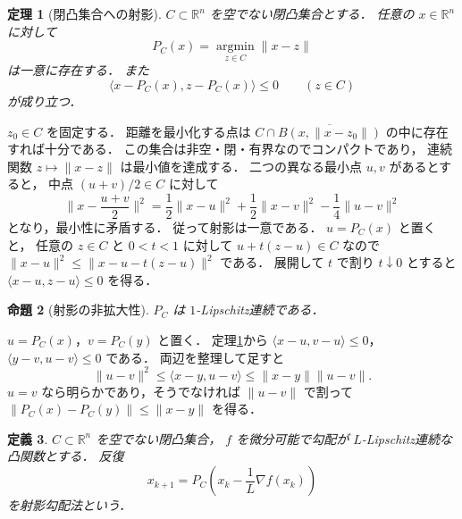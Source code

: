 \documentclass[a5paper,10pt,onecolumn]{jsarticle}
\makeatletter
\theoremstyle{mathnotetheorem}
\newtheorem{theorem}{定理}[section]
\newtheorem{definition}[theorem]{定義}
\newtheorem{proposition}[theorem]{命題}
\renewcommand{\proofname}{証明}
\renewenvironment{proof}[1][\proofname]{%
  \par\pushQED{\qed}\normalfont\topsep4\p@\@plus2\p@\relax
  \trivlist\item[\hskip\labelsep\bfseries #1]\ignorespaces
}{\popQED\endtrivlist\@endpefalse}
\newcommand{\norm}[1]{\lVert #1\rVert}
\makeatother
\begin{document}
\begin{theorem}[閉凸集合への射影]\label{thm:projection}
$C\subset\mathbb R^n$ を空でない閉凸集合とする．
任意の $x\in\mathbb R^n$ に対して
\[
 P_C(x)=\operatorname*{argmin}_{z\in C}\norm{x-z}
\]
は一意に存在する．
また
\[
 \langle x-P_C(x),z-P_C(x)\rangle\le0
 \qquad(z\in C)
\]
が成り立つ．
\end{theorem}
\begin{proof}
$z_0\in C$ を固定する．
距離を最小化する点は
$C\cap\overline{B(x,\norm{x-z_0})}$ の中に存在すれば十分である．
この集合は非空・閉・有界なのでコンパクトであり，
連続関数 $z\mapsto\norm{x-z}$ は最小値を達成する．
二つの異なる最小点 $u,v$ があるとすると，
中点 $(u+v)/2\in C$ に対して
\[
 \norm{x-\frac{u+v}2}^2
 =\frac12\norm{x-u}^2+\frac12\norm{x-v}^2
  -\frac14\norm{u-v}^2
\]
となり，最小性に矛盾する．
従って射影は一意である．
$u=P_C(x)$ と置くと，
任意の $z\in C$ と $0<t<1$ に対して
$u+t(z-u)\in C$ なので
$\norm{x-u}^2\le\norm{x-u-t(z-u)}^2$ である．
展開して $t$ で割り $t\downarrow0$ とすると
$\langle x-u,z-u\rangle\le0$ を得る．
\end{proof}

\begin{proposition}[射影の非拡大性]\label{prop:projection-lipschitz}
$P_C$ は $1$-Lipschitz連続である．
\end{proposition}
\begin{proof}
$u=P_C(x)$，$v=P_C(y)$ と置く．
定理\ref{thm:projection}から
$\langle x-u,v-u\rangle\le0$，
$\langle y-v,u-v\rangle\le0$ である．
両辺を整理して足すと
\[
 \norm{u-v}^2\le\langle x-y,u-v\rangle
 \le\norm{x-y}\norm{u-v}.
\]
$u=v$ なら明らかであり，そうでなければ
$\norm{u-v}$ で割って
$\norm{P_C(x)-P_C(y)}\le\norm{x-y}$ を得る．
\end{proof}

\begin{definition}
$C\subset\mathbb R^n$ を空でない閉凸集合，
$f$ を微分可能で勾配が $L$-Lipschitz連続な凸関数とする．
反復
\[
 x_{k+1}
 =P_C\left(x_k-\frac1L\nabla f(x_k)\right)
\]
を\emph{射影勾配法}という．
\end{definition}
\end{document}
